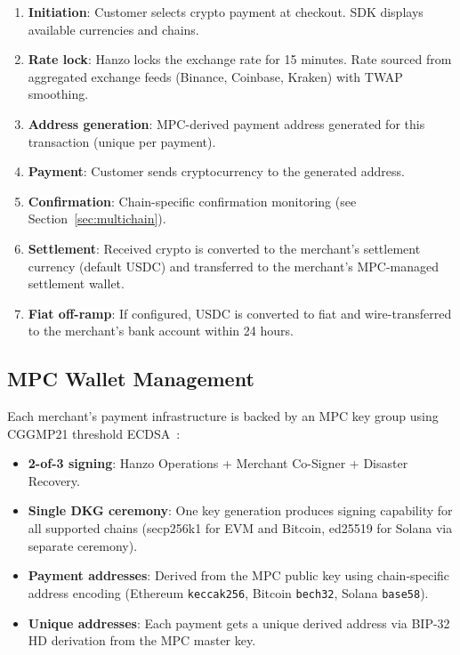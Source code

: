 \documentclass[11pt]{article}
\begin{document}
\begin{enumerate}[leftmargin=1.4em]
    \item \textbf{Initiation}: Customer selects crypto payment at
    checkout. SDK displays available currencies and chains.
    \item \textbf{Rate lock}: Hanzo locks the exchange rate for 15
    minutes. Rate sourced from aggregated exchange feeds (Binance,
    Coinbase, Kraken) with TWAP smoothing.
    \item \textbf{Address generation}: MPC-derived payment address
    generated for this transaction (unique per payment).
    \item \textbf{Payment}: Customer sends cryptocurrency to the
    generated address.
    \item \textbf{Confirmation}: Chain-specific confirmation monitoring
    (see Section~\ref{sec:multichain}).
    \item \textbf{Settlement}: Received crypto is converted to the
    merchant's settlement currency (default USDC) and transferred to
    the merchant's MPC-managed settlement wallet.
    \item \textbf{Fiat off-ramp}: If configured, USDC is converted to
    fiat and wire-transferred to the merchant's bank account within 24
    hours.
\end{enumerate}

\subsection{MPC Wallet Management}

Each merchant's payment infrastructure is backed by an MPC key group
using CGGMP21 threshold ECDSA~\cite{cggmp21}:

\begin{itemize}[leftmargin=1.4em]
    \item \textbf{2-of-3 signing}: Hanzo Operations + Merchant Co-Signer
    + Disaster Recovery.
    \item \textbf{Single DKG ceremony}: One key generation produces
    signing capability for all supported chains (secp256k1 for EVM and
    Bitcoin, ed25519 for Solana via separate ceremony).
    \item \textbf{Payment addresses}: Derived from the MPC public key
    using chain-specific address encoding (Ethereum \texttt{keccak256},
    Bitcoin \texttt{bech32}, Solana \texttt{base58}).
    \item \textbf{Unique addresses}: Each payment gets a unique derived
    address via BIP-32 HD derivation from the MPC master key.
\end{itemize}
\end{document}
